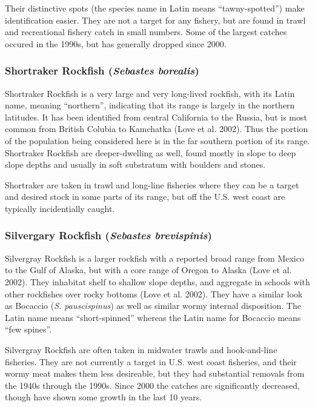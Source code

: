\documentclass[
  letterpaper,
]{article}
\begin{document}
Their distinctive spots (the species name in Latin means
``tawny-spotted'') make identification easier. They are not a target for
any fishery, but are found in trawl and recreational fishery catch in
small numbers. Some of the largest catches occured in the 1990s, but has
generally dropped since 2000.

\subsubsection{\texorpdfstring{Shortraker Rockfish (\emph{Sebastes
borealis})}{Shortraker Rockfish (Sebastes borealis)}}\label{shortraker-rockfish-sebastes-borealis}

Shortraker Rockfish is a very large and very long-lived rockfish, with
its Latin name, meaning ``northern'', indicating that its range is
largely in the northern latitudes. It has been identified from central
California to the Russia, but is most common from British Colubia to
Kamchatka (Love et al. 2002). Thus the portion of the population being
considered here is in the far southern portion of its range. Shortraker
Rockfish are deeper-dwelling as well, found mostly in slope to deep
slope depths and usually in soft substratum with boulders and stones.

Shortraker are taken in trawl and long-line fisheries where they can be
a target and desired stock in some parts of its range, but off the U.S.
west coast are typically incidentially caught.

\subsubsection{\texorpdfstring{Silvergary Rockfish (\emph{Sebastes
brevispinis})}{Silvergary Rockfish (Sebastes brevispinis)}}\label{silvergary-rockfish-sebastes-brevispinis}

Silvergray Rockfish is a larger rockfish with a reported broad range
from Mexico to the Gulf of Alaska, but with a core range of Oregon to
Alaska (Love et al. 2002). They inhabitat shelf to shallow slope depths,
and aggregate in schools with other rockfishes over rocky bottoms (Love
et al. 2002). They have a similar look as Bocaccio (\emph{S.
pauscispinus}) as well as similar wormy internal disposition. The Latin
name means ``short-spinned'' whereas the Latin name for Bocaccio means
``few spines''.

Silvergray Rockfish are often taken in midwater trawls and hook-and-line
fisheries. They are not currently a target in U.S. west coast fisheries,
and their wormy meat makes them less desireable, but they had
substantial removals from the 1940s through the 1990s. Since 2000 the
catches are significantly decreased, though have shown some growth in
the last 10 years.
\end{document}
